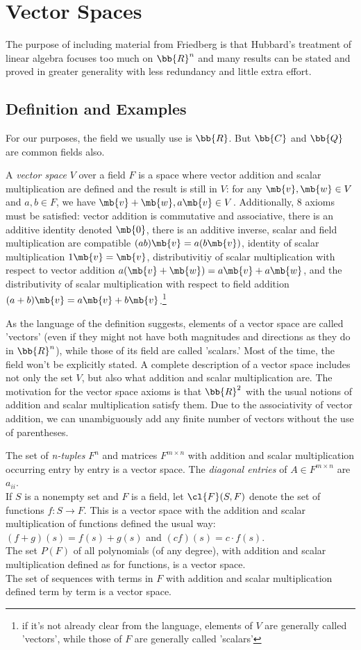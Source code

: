 \chapter{Vector Spaces}
The purpose of including material from Friedberg is that Hubbard's treatment of linear algebra focuses too much on $\bb{R}^n$ and many results can be stated and proved in greater generality with less redundancy and little extra effort.
\section{Definition and Examples}
For our purposes, the field we usually use is $\bb{R}$. But $\bb{C}$ and $\bb{Q}$ are common fields also.
\begin{defn}
A \emph{vector space} $V$ over a field $F$ is a space where vector addition and scalar multiplication are defined and the result is still in $V$: for any $\mb{v}, \mb{w}\in V$ and $a,b \in F$, we have $\mb{v}+ \mb{w}, a \mb{v}\in V$. Additionally, 8 axioms must be satisfied: vector addition is commutative and associative, there is an additive identity denoted $\mb{0}$, there is an additive inverse, scalar and field multiplication are compatible $(ab) \mb{v}=a(b \mb{v})$, identity of scalar multiplication $1 \mb{v}= \mb{v}$, distributivitiy of scalar multiplication with respect to vector addition $a( \mb{v}+ \mb{w})=a \mb{v}+ a \mb{w}$, and the distributivity of scalar multiplication with respect to field addition $(a+b) \mb{v}=a \mb{v}+b \mb{v}$.\footnote{if it's not already clear from the language, elements of $V$ are generally called 'vectors', while those of $F$ are generally called 'scalars'}
\end{defn}
As the language of the definition suggests, elements of a vector space are called 'vectors' (even if they might not have both magnitudes and directions as they do in $\bb{R}^n$), while those of its field are called 'scalars.' Most of the time, the field won't be explicitly stated.
A complete description of a vector space includes not only the set $V$, but also what addition and scalar multiplication are.
The motivation for the vector space axioms is that $\bb{R}^2$ with the usual notions of addition and scalar multiplication satisfy them.
Due to the associativity of vector addition, we can unambiguously add any finite number of vectors without the use of parentheses.
\begin{example}
The set of \emph{n-tuples} $F^n$ and matrices $F^{m \times n}$ with addition and scalar multiplication occurring entry by entry is a vector space. The \emph{diagonal entries} of $A \in F^{m \times n}$ are $a_{ii}$.\\
If $S$ is a nonempty set and $F$ is a field, let $\cl{F}(S,F)$ denote the set of functions $f:S \to F$. This is a vector space with the addition and scalar multiplication of functions defined the usual way: $(f+g)(s)=f(s)+g(s)$ and $(cf)(s)=c \cdot f(s)$.\\
The set $P(F)$ of all polynomials (of any degree), with addition and scalar multiplication defined as for functions, is a vector space.\\
The set of sequences with terms in $F$ with addition and scalar multiplication defined term by term is a vector space.
\end{example}
